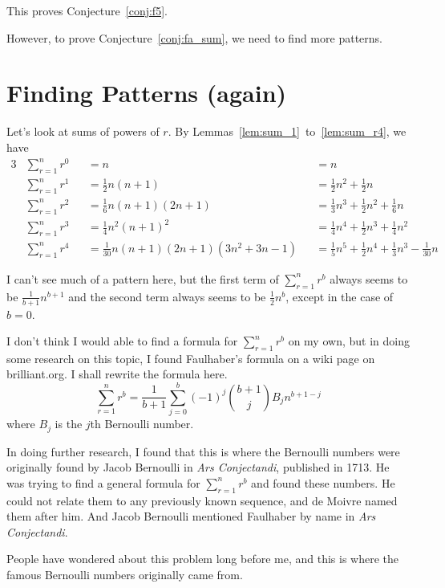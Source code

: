\documentclass[a4paper]{article}
\newcommand{\sn}{\sum\limits_{r=1}^{n}}
\newcommand{\oo}[1]{\frac{1}{#1}}
\begin{document}
This proves Conjecture~\ref{conj:f5}.

However, to prove Conjecture~\ref{conj:fa_sum}, we need to find more patterns.

\vspace{\fill} %

\section{Finding Patterns (again)}

Let's look at sums of powers of $r$. By Lemmas~\ref{lem:sum_1}~to~\ref{lem:sum_r4}, we have
\begin{alignat*}{3}
&\sn r^0 &&= n &&= n\\
&\sn r^1 &&= \oo{2}n(n + 1) &&= \oo{2}n^2 + \oo{2}n\\
&\sn r^2 &&= \oo{6}n(n + 1)(2n + 1) &&= \oo{3}n^3 + \oo{2}n^2 + \oo{6}n\\
&\sn r^3 &&= \oo{4}n^2(n + 1)^2 &&= \oo{4}n^4 + \oo{2}n^3 + \oo{4}n^2\\
&\sn r^4 &&= \oo{30}n(n + 1)(2n + 1)\left(3n^2 + 3n - 1\right) &&= \oo{5}n^5 + \oo{2}n^4 + \oo{3}n^3 - \oo{30}n
\end{alignat*}

I can't see much of a pattern here, but the first term of $\sn r^b$ always seems to be $\oo{b+1}n^{b+1}$ and the second term always seems to be $\oo{2}n^{b}$, except in the case of $b = 0$.

I don't think I would able to find a formula for $\sn r^b$ on my own, but in doing some research on this topic, I found Faulhaber's formula on a wiki page on brilliant.org\cite{brilliant.org-sums-wiki}. I shall rewrite the formula here. $$\sn r^b = \oo{b+1} \sum_{j=0}^b (-1)^j \binom{b+1}{j} B_j n^{b+1-j}$$ where $B_j$ is the $j$th Bernoulli number.

In doing further research, I found that this is where the Bernoulli numbers were originally found by Jacob Bernoulli in \textit{Ars Conjectandi}, published in 1713. He was trying to find a general formula for $\sn r^b$ and found these numbers. He could not relate them to any previously known sequence, and de Moivre named them after him. And Jacob Bernoulli mentioned Faulhaber by name in \textit{Ars Conjectandi}.\cite{wikipedia-bernoulli-numbers}

People have wondered about this problem long before me, and this is where the famous Bernoulli numbers originally came from.
\end{document}
